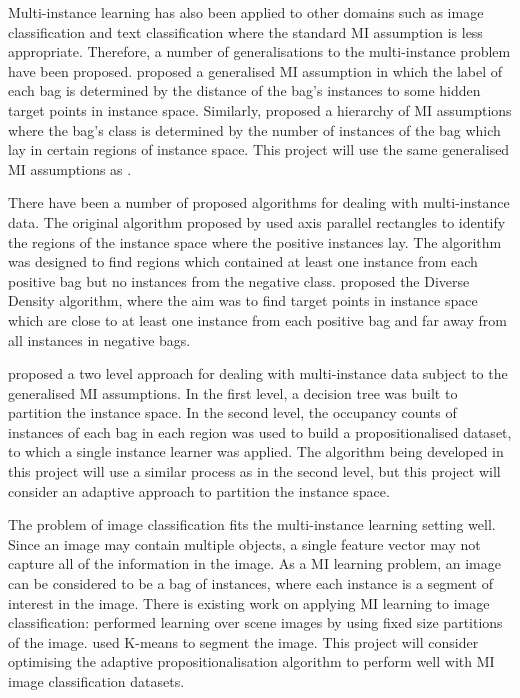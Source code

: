 \documentclass[a4paper,12pt]{article} %
\begin{document}
Multi-instance learning has also been applied to other domains such as image classification and text classification where the standard MI assumption is less appropriate. Therefore, a number of generalisations to the multi-instance problem have been proposed.
 proposed a generalised MI assumption in which the label of each bag is determined by the distance of the bag's instances to some hidden target points in instance space.
Similarly,  proposed a hierarchy of MI assumptions where the bag's class is determined by the number of instances of the bag which lay in certain regions of instance space.
This project will use the same generalised MI assumptions as .

There have been a number of proposed algorithms for dealing with multi-instance data. The original algorithm proposed by  used axis parallel rectangles to identify the regions of the instance space where the positive instances lay. The algorithm was designed to find regions which contained at least one instance from each positive bag but no instances from the negative class. 
 proposed the Diverse Density algorithm, where the aim was to find target points in instance space which are close to at least one instance from each positive bag and far away from all instances in negative bags.

 proposed a two level approach for dealing with multi-instance data subject to the generalised MI assumptions. In the first level, a decision tree was built to partition the instance space. In the second level, the occupancy counts of instances of each bag in each region was used to build a propositionalised dataset, to which a single instance learner was applied.
The algorithm being developed in this project will use a similar process as  in the second level, but this project will consider an adaptive approach to partition the instance space.

The problem of image classification fits the multi-instance learning setting well. Since an image may contain multiple objects, a single feature vector may not capture all of the information in the image. As a MI learning problem, an image can be considered to be a bag of instances, where each instance is a segment of interest in the image. There is existing work on applying MI learning to image classification:  performed learning over scene images by using fixed size partitions of the image.  used K-means to segment the image. This project will consider optimising the adaptive propositionalisation algorithm to perform well with MI image classification datasets.
\end{document}
